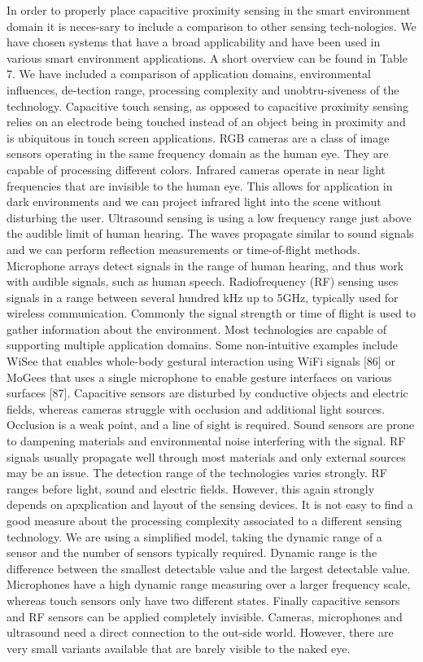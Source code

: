 In order to properly place capacitive proximity sensing in the smart environment domain it is neces-sary to include a comparison to other sensing tech-nologies. We have chosen systems that have a broad applicability and have been used in various smart environment applications. A short overview can be found in Table 7. We have included a comparison of application domains, environmental influences, de-tection range, processing complexity and unobtru-siveness of the technology. 
Capacitive touch sensing, as opposed to capacitive proximity sensing relies on an electrode being touched instead of an object being in proximity and is ubiquitous in touch screen applications.
RGB cameras are a class of image sensors operating in the same frequency domain as the human eye. They are capable of processing different colors.
Infrared cameras operate in near light frequencies that are invisible to the human eye. This allows for application in dark environments and we can project infrared light into the scene without disturbing the user.
Ultrasound sensing is using a low frequency range just above the audible limit of human hearing. The waves propagate similar to sound signals and we can perform reflection measurements or time-of-flight methods.
Microphone arrays detect signals in the range of human hearing, and thus work with audible signals, such as human speech.
Radiofrequency (RF) sensing uses signals in a range between several hundred kHz up to 5GHz, typically used for wireless communication. Commonly the signal strength or time of flight is used to gather information about the environment.
Most technologies are capable of supporting multiple application domains. Some non-intuitive examples include WiSee that enables whole-body gestural interaction using WiFi signals [86] or MoGees that uses a single microphone to enable gesture interfaces on various surfaces [87]. 
Capacitive sensors are disturbed by conductive objects and electric fields, whereas cameras struggle with occlusion and additional light sources. Occlusion is a weak point, and a line of sight is required. Sound sensors are prone to dampening materials and environmental noise interfering with the signal. RF signals usually propagate well through most materials and only external sources may be an issue. 
The detection range of the technologies varies strongly. RF ranges before light, sound and electric fields. However, this again strongly depends on apxplication and layout of the sensing devices.
It is not easy to find a good measure about the processing complexity associated to a different sensing technology. We are using a simplified model, taking the dynamic range of a sensor and the number of sensors typically required. Dynamic range is the difference between the smallest detectable value and the largest detectable value. Microphones have a high dynamic range measuring over a larger frequency scale, whereas touch sensors only have two different states. 
Finally capacitive sensors and RF sensors can be applied completely invisible. Cameras, microphones and ultrasound need a direct connection to the out-side world. However, there are very small variants available that are barely visible to the naked eye.

